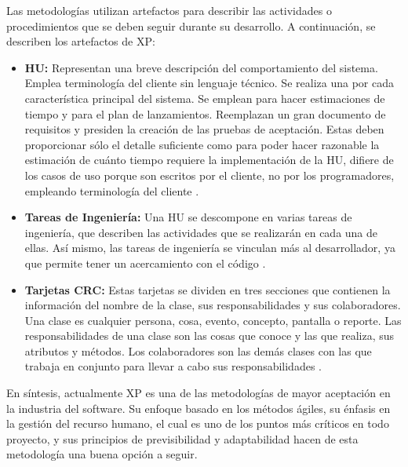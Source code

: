 {    
    
    Las metodologías utilizan artefactos para describir las actividades o procedimientos que se deben seguir durante su desarrollo. A continuación, se describen los artefactos de \ac{XP}:
    
    \begin{itemize}
    	\item \textbf{\ac{HU}:}
    	Representan una breve descripción del comportamiento del sistema. Emplea terminología del cliente sin lenguaje técnico. Se realiza una por cada característica principal del sistema. Se emplean para hacer estimaciones de tiempo y para el plan de lanzamientos. Reemplazan un gran documento de requisitos y presiden la creación de las pruebas de aceptación. Estas deben proporcionar sólo el detalle suficiente como para poder hacer razonable la estimación de cuánto tiempo requiere la implementación de la \ac{HU}, difiere de los casos de uso porque son escritos por el cliente, no por los programadores, empleando terminología del cliente \citep{pressman2014se}.
    	\item \textbf{Tareas de Ingeniería:}
    	Una \ac{HU} se descompone en varias tareas de ingeniería, que describen las actividades que se realizarán en cada una de ellas. Así mismo, las tareas de ingeniería se vinculan más al desarrollador, ya que permite tener un acercamiento con el código \citep{pressman2014se}.
    	\item \textbf{Tarjetas \ac{CRC}:}
    	Estas tarjetas se dividen en tres secciones que contienen la información del nombre de la clase, sus responsabilidades y sus colaboradores. Una clase es cualquier persona, cosa, evento, concepto, pantalla o reporte. Las responsabilidades de una clase son las cosas que conoce y las que realiza, sus atributos y métodos. Los colaboradores son las demás clases con las que trabaja en conjunto para llevar a cabo sus responsabilidades \citep{pressman2014se}.
    \end{itemize}
    
    En síntesis, actualmente \ac{XP} es una de las metodologías de mayor aceptación en la industria del software. Su enfoque basado en los métodos ágiles, su énfasis en la gestión del recurso humano, el cual es uno de los puntos más críticos en todo proyecto, y sus principios de previsibilidad y adaptabilidad hacen de esta metodología una buena opción a seguir.
    
}
